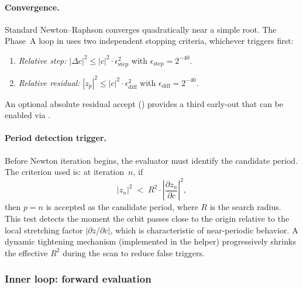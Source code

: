 \paragraph{Convergence.}
Standard Newton--Raphson converges quadratically near a simple root.  The
Phase~A loop in  uses two independent
stopping criteria, whichever triggers first:
\begin{enumerate}
\item \emph{Relative step:}
  $|\Delta c|^2 \le |c|^2 \cdot \epsilon_{\mathrm{step}}^2$
  with $\epsilon_{\mathrm{step}} = 2^{-40}$.
\item \emph{Relative residual:}
  $|z_p|^2 \le |c|^2 \cdot \epsilon_{\mathrm{diff}}^2$
  with $\epsilon_{\mathrm{diff}} = 2^{-40}$.
\end{enumerate}
An optional absolute residual accept () provides a third
early-out that can be enabled via .

\paragraph{Period detection trigger.}
Before Newton iteration begins, the evaluator must identify the candidate
period.  The criterion used is: at iteration~$n$, if
\begin{equation}\label{eq:ff-period-trigger}
|z_n|^2 \;<\; R^2 \cdot \left|\frac{\partial z_n}{\partial c}\right|^2,
\end{equation}
then $p = n$ is accepted as the candidate period, where $R$ is the search
radius.  This test detects the moment the orbit passes close to the origin
relative to the local stretching factor $|\partial z/\partial c|$, which is
characteristic of near-periodic behavior.  A dynamic tightening mechanism
(implemented in the  helper) progressively shrinks the
effective $R^2$ during the scan to reduce false triggers.

\subsubsection{Inner loop: forward evaluation}
\label{subsubsec:ff-inner}

